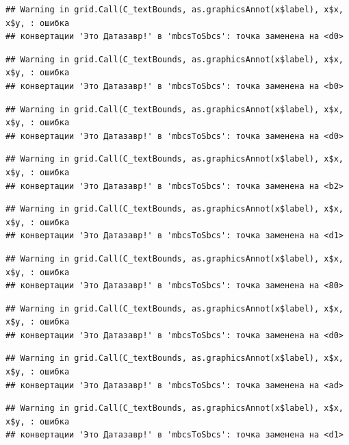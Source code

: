 \documentclass[]{book}
\begin{document}
\begin{verbatim}
## Warning in grid.Call(C_textBounds, as.graphicsAnnot(x$label), x$x, x$y, : ошибка
## конвертации 'Это Датазавр!' в 'mbcsToSbcs': точка заменена на <d0>
\end{verbatim}

\begin{verbatim}
## Warning in grid.Call(C_textBounds, as.graphicsAnnot(x$label), x$x, x$y, : ошибка
## конвертации 'Это Датазавр!' в 'mbcsToSbcs': точка заменена на <b0>
\end{verbatim}

\begin{verbatim}
## Warning in grid.Call(C_textBounds, as.graphicsAnnot(x$label), x$x, x$y, : ошибка
## конвертации 'Это Датазавр!' в 'mbcsToSbcs': точка заменена на <d0>
\end{verbatim}

\begin{verbatim}
## Warning in grid.Call(C_textBounds, as.graphicsAnnot(x$label), x$x, x$y, : ошибка
## конвертации 'Это Датазавр!' в 'mbcsToSbcs': точка заменена на <b2>
\end{verbatim}

\begin{verbatim}
## Warning in grid.Call(C_textBounds, as.graphicsAnnot(x$label), x$x, x$y, : ошибка
## конвертации 'Это Датазавр!' в 'mbcsToSbcs': точка заменена на <d1>
\end{verbatim}

\begin{verbatim}
## Warning in grid.Call(C_textBounds, as.graphicsAnnot(x$label), x$x, x$y, : ошибка
## конвертации 'Это Датазавр!' в 'mbcsToSbcs': точка заменена на <80>
\end{verbatim}

\begin{verbatim}
## Warning in grid.Call(C_textBounds, as.graphicsAnnot(x$label), x$x, x$y, : ошибка
## конвертации 'Это Датазавр!' в 'mbcsToSbcs': точка заменена на <d0>
\end{verbatim}

\begin{verbatim}
## Warning in grid.Call(C_textBounds, as.graphicsAnnot(x$label), x$x, x$y, : ошибка
## конвертации 'Это Датазавр!' в 'mbcsToSbcs': точка заменена на <ad>
\end{verbatim}

\begin{verbatim}
## Warning in grid.Call(C_textBounds, as.graphicsAnnot(x$label), x$x, x$y, : ошибка
## конвертации 'Это Датазавр!' в 'mbcsToSbcs': точка заменена на <d1>
\end{verbatim}
\end{document}
